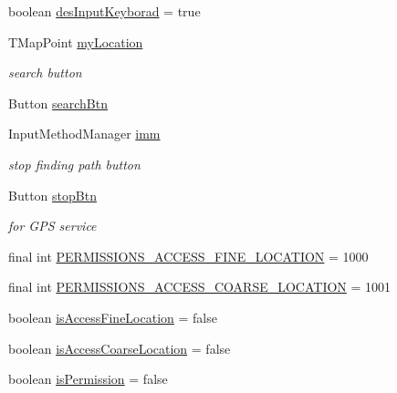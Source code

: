 \begin{DoxyCompactItemize}
\item 
boolean \mbox{\hyperlink{classhi_1_1world_1_1hello_1_1myapplication_1_1_main_activity_a7b12ba1fbd83c76eed9311d396952cdc}{des\+Input\+Keyborad}} = true
\item 
T\+Map\+Point \mbox{\hyperlink{classhi_1_1world_1_1hello_1_1myapplication_1_1_main_activity_ab61e0321fd07bab1210d7d78f667f166}{my\+Location}}
\begin{DoxyCompactList}\small\item\em search button \end{DoxyCompactList}\item 
Button \mbox{\hyperlink{classhi_1_1world_1_1hello_1_1myapplication_1_1_main_activity_a86af0ade696692241c5d56fa4f9feb98}{search\+Btn}}
\item 
Input\+Method\+Manager \mbox{\hyperlink{classhi_1_1world_1_1hello_1_1myapplication_1_1_main_activity_a055bfa84a51cde7078a652f70ca02eee}{imm}}
\begin{DoxyCompactList}\small\item\em stop finding path button \end{DoxyCompactList}\item 
Button \mbox{\hyperlink{classhi_1_1world_1_1hello_1_1myapplication_1_1_main_activity_a8ef4311d4ffc2c0dbe5a56525fdbdf19}{stop\+Btn}}
\begin{DoxyCompactList}\small\item\em for G\+PS service \end{DoxyCompactList}\item 
final int \mbox{\hyperlink{classhi_1_1world_1_1hello_1_1myapplication_1_1_main_activity_ae247886578794112615130e9867010f0}{P\+E\+R\+M\+I\+S\+S\+I\+O\+N\+S\+\_\+\+A\+C\+C\+E\+S\+S\+\_\+\+F\+I\+N\+E\+\_\+\+L\+O\+C\+A\+T\+I\+ON}} = 1000
\item 
final int \mbox{\hyperlink{classhi_1_1world_1_1hello_1_1myapplication_1_1_main_activity_a3a60fc908bdd09c2fdac5a7f0de1d08e}{P\+E\+R\+M\+I\+S\+S\+I\+O\+N\+S\+\_\+\+A\+C\+C\+E\+S\+S\+\_\+\+C\+O\+A\+R\+S\+E\+\_\+\+L\+O\+C\+A\+T\+I\+ON}} = 1001
\item 
boolean \mbox{\hyperlink{classhi_1_1world_1_1hello_1_1myapplication_1_1_main_activity_a6f04b9e298d77513dfdad5fa4721f7d2}{is\+Access\+Fine\+Location}} = false
\item 
boolean \mbox{\hyperlink{classhi_1_1world_1_1hello_1_1myapplication_1_1_main_activity_a8181ed3177d72819c6e50fa3f71bde44}{is\+Access\+Coarse\+Location}} = false
\item 
boolean \mbox{\hyperlink{classhi_1_1world_1_1hello_1_1myapplication_1_1_main_activity_a60b1d806a60285489a327a9597bd2bd2}{is\+Permission}} = false

\end{DoxyCompactItemize}
